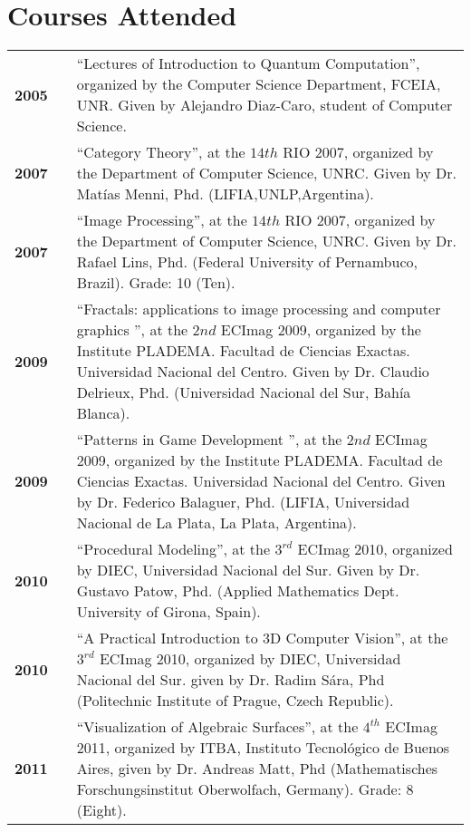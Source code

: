 \documentclass[a4paper,12pt]{article}
\begin{document}
\section*{Courses Attended}

\begin{tabular}{lcp{10 cm}}
\bf{2005} & &\textquotedblleft Lectures of Introduction to Quantum Computation\textquotedblright, organized by the Computer Science Department, FCEIA, UNR. Given by Alejandro Diaz-Caro, student of Computer Science.\\
\bf{2007}& & \textquotedblleft Category Theory\textquotedblright, at the $14{th}$ RIO 2007, organized by the Department of Computer Science, UNRC. Given by Dr. Mat\'ias Menni, Phd. (LIFIA,UNLP,Argentina).\\
\bf{2007}& & \textquotedblleft Image Processing\textquotedblright, at the $14{th}$ RIO 2007, organized by the Department of Computer Science, UNRC. Given by Dr. Rafael Lins, Phd. (Federal University of Pernambuco, Brazil). Grade: 10 (Ten).\\
\bf{2009}& & \textquotedblleft Fractals: applications to image processing and computer graphics
 \textquotedblright, at the $2{nd}$ ECImag 2009, organized by the Institute PLADEMA. Facultad de Ciencias Exactas. Universidad Nacional del Centro. Given by Dr. Claudio Delrieux, Phd. (Universidad Nacional del Sur, Bah\'ia Blanca).\\
\bf{2009}& & \textquotedblleft Patterns in Game Development \textquotedblright, at the $2{nd}$ ECImag 2009, organized by the Institute PLADEMA. Facultad de Ciencias Exactas. Universidad Nacional del Centro. Given by Dr. Federico Balaguer, Phd. (LIFIA, Universidad Nacional de La Plata, La Plata, Argentina).\\
\bf{2010}& & \textquotedblleft Procedural Modeling\textquotedblright, at the $3^{rd}$ ECImag 2010, organized by DIEC, Universidad Nacional del Sur. Given by Dr. Gustavo Patow, Phd. (Applied Mathematics Dept. University of Girona, Spain).\\
\bf{2010}& & \textquotedblleft A Practical Introduction to 3D Computer Vision\textquotedblright, at the $3^{rd}$ ECImag 2010, organized by DIEC, Universidad Nacional del Sur. given by Dr. Radim S\'ara, Phd (Politechnic Institute of Prague, Czech Republic).\\
\bf{2011}& & \textquotedblleft Visualization of Algebraic Surfaces\textquotedblright, at the $4^{th}$ ECImag 2011, organized by ITBA, Instituto Tecnol\'ogico de Buenos Aires, given by Dr. Andreas Matt, Phd (Mathematisches Forschungsinstitut Oberwolfach, Germany). Grade: 8 (Eight).\\

\end{tabular}
\end{document}
